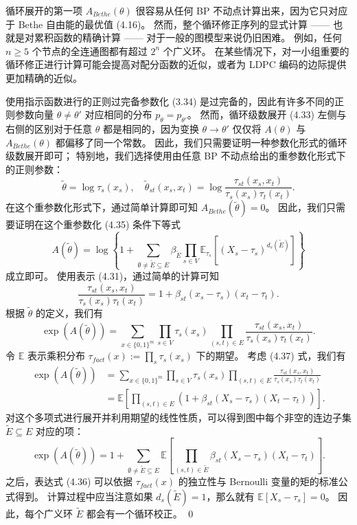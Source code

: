 循环展开的第一项 $A_{Bethe}(\theta)$ 很容易从任何 BP 不动点计算出来，因为它只对应于 Bethe 自由能的最优值 (4.16)。
然而，整个循环修正序列的显式计算 —— 也就是对累积函数的精确计算 —— 对于一般的图模型来说仍旧困难。
例如，任何 $n \geq 5$ 个节点的全连通图都有超过 $2^n$ 个广义环。
在某些情况下，对一小组重要的循环修正进行计算可能会提高对配分函数的近似，或者为 LDPC 编码的边际提供更加精确的近似。

\analysis[命题 4.4 的证明]
使用指示函数进行的正则过完备参数化 (3.34) 是过完备的，因此有许多不同的正则参数向量 $\theta \neq \theta'$ 对应相同的分布 $p_{\theta} = p_{\theta'}$。
然而，循环级数展开 (4.33) 左侧与右侧的区别对于任意 $\theta$ 都是相同的，因为变换 $\theta \rightarrow \theta'$ 仅仅将 $A(\theta)$ 与 $A_{Bethe}(\theta)$ 都偏移了同一个常数。
因此，我们只需要证明一种参数化形式的循环级数展开即可；
特别地，我们选择使用由任意 BP 不动点给出的重参数化形式下的正则参数：
\begin{equation}
    \tilde{\theta} = \log\tau_s(x_s), \quad \tilde{\theta}_{st}(x_s, x_t) = \log\frac{\tau_{st}(x_s, x_t)}{\tau_s(x_s)\tau_t(x_t)}.
\end{equation}
在这个重参数化形式下，通过简单计算即可知 $A_{Bethe}(\tilde{\theta}) = 0$。
因此，我们只需要证明在这个重参数化 (4.35) 条件下等式
\begin{equation}
    A(\tilde{\theta}) = \log\left\{1+\sum_{\emptyset\neq\tilde{E}\subseteq E}\beta_{\tilde{E}}\prod_{s \in V}\mathbb{E}_{\tau_s}[(X_s-\tau_s)^{d_s(\tilde{E})}]\right\}
\end{equation}
成立即可。
使用表示 (4.31)，通过简单的计算可知
\begin{equation}
    \frac{\tau_{st}(x_s, x_t)}{\tau_s(x_s)\tau_t(x_t)} = 1 + \beta_{st}(x_s-\tau_s)(x_t-\tau_t).
\end{equation}
根据 $\tilde{\theta}$ 的定义，我们有
\begin{equation*}
    \exp(A(\tilde{\theta})) = \sum_{x \in \{0, 1\}^m}\prod_{s \in V}\tau_s(x_s)\prod_{(s, t) \in E}\frac{\tau_{st}(x_s, x_t)}{\tau_s(x_s)\tau_t(x_t)}.
\end{equation*}
令 $\mathbb{E}$ 表示乘积分布 $\tau_{fact}(x) := \prod_s\tau_s(x_s)$ 下的期望。
考虑 (4.37) 式，我们有
\begin{align}
    \exp(A(\tilde{\theta})) &= \sum_{x \in \{0, 1\}^m}\prod_{s \in V}\tau_s(x_s)\prod_{(s, t) \in E}\frac{\tau_{st}(x_s, x_t)}{\tau_s(x_s)\tau_t(x_t)} \nonumber \\
    &= \mathbb{E}\left[\prod_{(s, t) \in E}(1+\beta_{st}(X_s-\tau_s)(X_t-\tau_t))\right].
\end{align}
对这个多项式进行展开并利用期望的线性性质，可以得到图中每个非空的连边子集 $\tilde{E} \subseteq E$ 对应的项：
\begin{equation}
    \exp(A(\tilde{\theta})) = 1 + \sum_{\emptyset\neq\tilde{E}\subseteq E}\mathbb{E}\left[\prod_{(s, t) \in \tilde{E}}\beta_{st}(X_s-\tau_s)(X_t-\tau_t)\right].
\end{equation}
之后，表达式 (4.36) 可以依据 $\tau_{fact}(x)$ 的独立性与 Bernoulli 变量的矩的标准公式得到。
计算过程中应当注意如果 $d_s(\tilde{E}) = 1$，那么就有 $\mathbb{E}[X_s-\tau_s] = 0$。
因此，每个广义环 $\tilde{E}$ 都会有一个循环校正。
\qed

